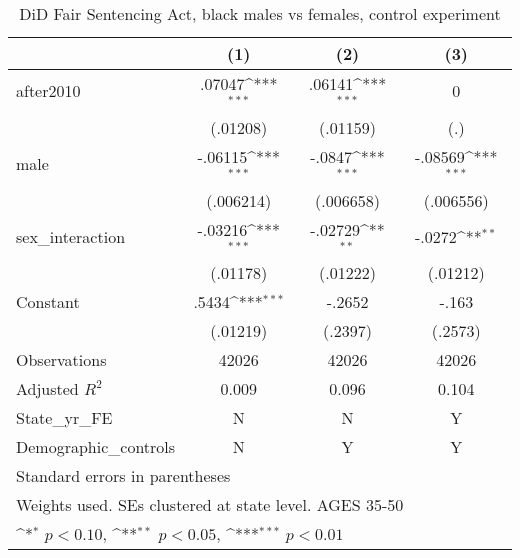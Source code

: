 \begin{table}[htbp]\centering
\def\sym#1{\ifmmode^{#1}\else\(^{#1}\)\fi}
\caption{DiD Fair Sentencing Act, black males vs females, control experiment}
\begin{tabular}{l*{3}{c}}
\hline\hline
                    &\multicolumn{1}{c}{(1)}         &\multicolumn{1}{c}{(2)}         &\multicolumn{1}{c}{(3)}         \\
\hline
after2010           &      .07047\sym{***}&      .06141\sym{***}&           0         \\
                    &    (.01208)         &    (.01159)         &         (.)         \\
[1em]
male                &     -.06115\sym{***}&      -.0847\sym{***}&     -.08569\sym{***}\\
                    &   (.006214)         &   (.006658)         &   (.006556)         \\
[1em]
sex\_interaction     &     -.03216\sym{***}&     -.02729\sym{**} &      -.0272\sym{**} \\
                    &    (.01178)         &    (.01222)         &    (.01212)         \\
[1em]
Constant            &       .5434\sym{***}&      -.2652         &       -.163         \\
                    &    (.01219)         &     (.2397)         &     (.2573)         \\
\hline
Observations        &       42026         &       42026         &       42026         \\
Adjusted \(R^{2}\)  &       0.009         &       0.096         &       0.104         \\
State\_yr\_FE         &           N         &           N         &           Y         \\
Demographic\_controls&           N         &           Y         &           Y         \\
\hline\hline
\multicolumn{4}{l}{\footnotesize Standard errors in parentheses}\\
\multicolumn{4}{l}{\footnotesize Weights used. SEs clustered at state level. AGES 35-50}\\
\multicolumn{4}{l}{\footnotesize \sym{*} \(p<0.10\), \sym{**} \(p<0.05\), \sym{***} \(p<0.01\)}\\
\end{tabular}
\end{table}
